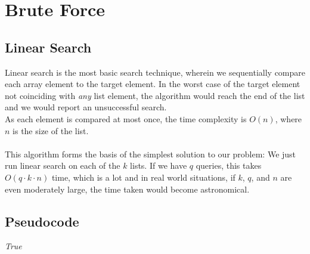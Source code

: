 \documentclass[11pt]{article}
\begin{document}
\section{Brute Force}
\subsection{Linear Search}

Linear search is the most basic search technique, wherein we sequentially compare each array element to the target element. In the worst case of the target element not coinciding with \textit{any} list element, the algorithm would reach the end of the list and we would report an unsuccessful search. \\
As each element is compared at most once, the time complexity is $O(n)$, where $n$ is the size of the list. \\ \\

This algorithm forms the basis of the simplest solution to our problem: We just run linear search on each of the $k$ lists. If we have $q$ queries, this takes $O(q \cdot k \cdot n)$ time, which is a lot and in real world situations, if $k$, $q$, and $n$ are even moderately large, the time taken would become astronomical. \\ 

\subsection{Pseudocode}
\begin{tcolorbox}[blanker,width=(\linewidth-3.5cm)]
\begin{algorithm}[H]
    \SetAlgoLined
    
    
    {
        {
                {\KwRet \textit{True}\;}
        }
    }
    
    
    

\end{algorithm}
\end{tcolorbox}
\end{document}
